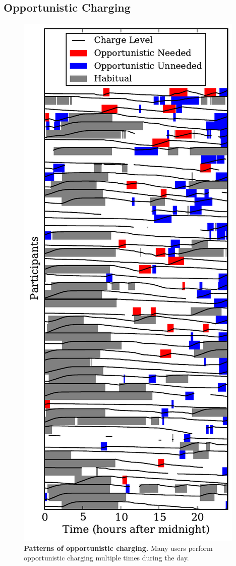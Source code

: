 \subsection{Opportunistic Charging}
\label{subsec-opportunistic}

\begin{figure}[t]
\includegraphics[width=\columnwidth]{./figures/power/opportunistic_charging/count_and_by_time/graph.pdf}
\caption{\textbf{Patterns of opportunistic charging.} Many users perform
opportunistic charging multiple times during the day.}
\label{fig-opportunistic-patterns}
\end{figure}

